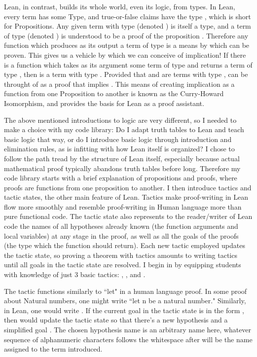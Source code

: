 Lean, in contrast, builds its whole world, even its logic, from types. 
In Lean, every term has some Type, and true-or-false claims have the type 
, which is short for Propositions. Any given term  with
type  (denoted ) is itself a type, and a term 
 of type  (denoted ) is understood to be a 
proof of the proposition . Therefore any function which produces as its
output a term of type  is a means by which  can be proven. This gives 
us a vehicle by which we can conceive of implication! If there is a function
 which takes as its argument some term  of type  and returns
a term of type , then  is a term with type . Provided that 
 and  are terms with type ,  can be throught of as a proof
that  implies . This means of creating implication as a function from
one Proposition to another is known as the Curry-Howard Isomorphism, and
provides the basis for Lean as a proof assistant. 

The above mentioned introductions to logic are very different, so I needed
to make a choice with my code library: Do I adapt truth tables to
Lean and teach basic logic that way, or do I introduce basic logic through
introduction and elimination rules, as is infitting with how Lean itself 
is organized? I chose to follow the path tread by the structure of Lean itself,
especially because actual mathematical proof typically abandons truth tables
before long. Therefore my code library starts with a brief explanation of
propositions and proofs, where proofs are functions from one proposition to
another. I then introduce tactics and tactic states, the other main feature
of Lean. Tactics make proof-writing in Lean flow more smoothly and resemble 
proof-writing in Human language more than pure functional code. The tactic
state also represents to the reader/writer of Lean code the names of all
hypotheses already known (the function arguments and local variables) at any stage in the proof, as 
well as all the goals of the proofs (the type which the function should return).
Each new tactic employed updates the tactic state, so proving a theorem with
tactics amounts to writing tactics until all goals in the tactic state are resolved. 
I begin in  
by equipping students with knowledge of just 3 basic tactics: 
, , and .

The  tactic functions similarly to ``let" in a human language proof. 
In some proof about Natural numbers, one might write ``let n be a natural number."
Similarly, in Lean, one would write .
If the current goal in the tactic state is in the form , then
 would update the tactic state so that there's a new hypothesis
 and a simplified goal . The chosen hypothesis name  is an arbitrary name here, whatever
sequence of alphanumeric characters follows the whitespace after  will
be the name assigned to the term introduced. 

